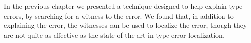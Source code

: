 \label{sec:nate:introduction}

%

%

In the previous chapter we presented a technique designed
to help explain type errors, by searching for a witness to the error.
%
We found that, in addition to explaining the error, the witnesses can be
used to localize the error, though they are not quite as effective
as the state of the art in type error localization.

